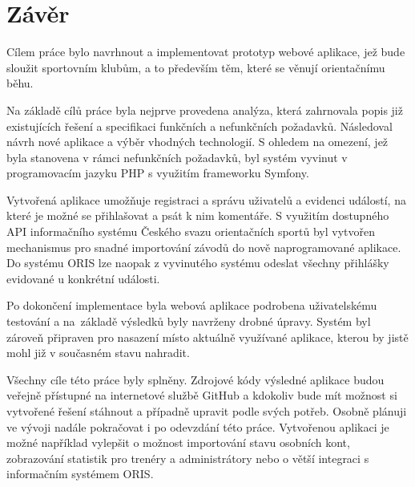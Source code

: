 \chapter{Závěr}

Cílem práce bylo navrhnout a implementovat prototyp webové aplikace, jež bude sloužit sportovním klubům, a to především těm, které se věnují orientačnímu běhu.

Na základě cílů práce byla nejprve provedena analýza, která zahrnovala popis již existujících řešení a specifikaci funkčních a nefunkčních požadavků. Následoval návrh nové aplikace a výběr vhodných technologií. S ohledem na omezení, jež byla stanovena v rámci nefunkčních požadavků, byl systém vyvinut v programovacím jazyku PHP s využitím frameworku Symfony.

Vytvořená aplikace umožňuje registraci a správu uživatelů a evidenci událostí, na které je možné se přihlašovat a psát k nim komentáře. S využitím dostupného API informačního systému Českého svazu orientačních sportů byl vytvořen mechanismus pro snadné importování závodů do nově naprogramované aplikace. Do systému ORIS lze naopak z vyvinutého systému odeslat všechny přihlášky evidované u konkrétní události.

Po dokončení implementace byla webová aplikace podrobena uživatelskému testování a na~základě výsledků byly navrženy drobné úpravy. Systém byl zároveň připraven pro nasazení místo aktuálně využívané aplikace, kterou by jistě mohl již v současném stavu nahradit.

Všechny cíle této práce byly splněny. Zdrojové kódy výsledné aplikace budou veřejně přístupné na internetové službě GitHub a kdokoliv bude mít možnost si vytvořené řešení stáhnout a případně upravit podle svých potřeb. Osobně plánuji ve vývoji nadále pokračovat i po odevzdání této práce. Vytvořenou aplikaci je možné například vylepšit o možnost importování stavu osobních kont, zobrazování statistik pro trenéry a administrátory nebo o větší integraci s informačním systémem ORIS.
